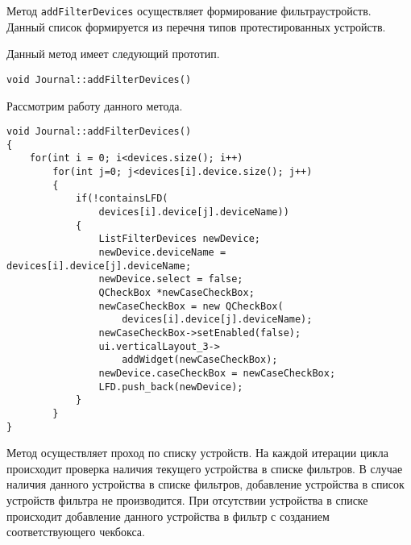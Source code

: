 Метод \texttt{addFilterDevices} осуществляет формирование фильтра\break устройств. Данный список формируется из перечня типов
протестированных устройств.

Данный метод
имеет следующий прототип.
\medskip
\begin{verbatim}
void Journal::addFilterDevices()
\end{verbatim}
\medskip

Рассмотрим работу данного метода.
\medskip
\begin{verbatim}
void Journal::addFilterDevices()
{
	for(int i = 0; i<devices.size(); i++)
		for(int j=0; j<devices[i].device.size(); j++)
		{
			if(!containsLFD(
				devices[i].device[j].deviceName))
			{
				ListFilterDevices newDevice;
				newDevice.deviceName = devices[i].device[j].deviceName;
				newDevice.select = false;
				QCheckBox *newCaseCheckBox;
				newCaseCheckBox = new QCheckBox(
					devices[i].device[j].deviceName);
				newCaseCheckBox->setEnabled(false);
				ui.verticalLayout_3->
					addWidget(newCaseCheckBox);
				newDevice.caseCheckBox = newCaseCheckBox;
				LFD.push_back(newDevice);
			}
		}
}
\end{verbatim}
\medskip

Метод осуществляет проход по списку устройств. На каждой итерации цикла происходит проверка наличия текущего устройства в
списке фильтров. В случае наличия данного устройства в списке фильтров, добавление устройства в список устройств
фильтра не производится. При отсутствии устройства в списке происходит добавление данного устройства в фильтр с
созданием соответствующего чекбокса.




